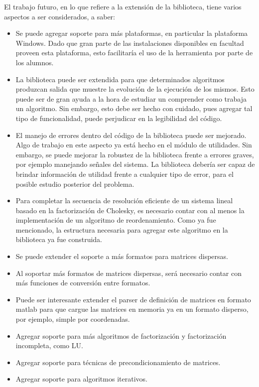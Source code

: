 \documentclass{cacic06}
\begin{document}
El trabajo futuro, en lo que refiere a la extensión de la biblioteca, tiene varios aspectos a ser considerados, a saber:
\begin{itemize}
 \item Se puede agregar soporte para más plataformas, en particular la plataforma Windows. Dado que gran parte de las instalaciones disponibles en facultad proveen esta plataforma, esto facilitaría el uso de la herramienta por parte de los alumnos.
 \item La biblioteca puede ser extendida para que determinados algoritmos produzcan salida que muestre la evolución de la ejecución de los mismos. Esto puede ser de gran ayuda a la hora de estudiar un comprender como trabaja un algoritmo. Sin embargo, esto debe ser hecho con cuidado, pues agregar tal tipo de funcionalidad, puede perjudicar en la legibilidad del código.
\item El manejo de errores dentro del código de la biblioteca puede ser mejorado. Algo de trabajo en este aspecto ya está hecho en el módulo de utilidades. Sin embargo, se puede mejorar la robustez de la biblioteca frente a errores graves, por ejemplo manejando señales del sistema. La biblioteca debería ser capaz de brindar información de utilidad frente a cualquier tipo de error, para el posible estudio posterior del problema.
\item Para completar la secuencia de resolución eficiente de un sistema lineal basado en la factorización de Cholesky, es necesario contar con al menos la implementación de un algoritmo de reordenamiento. Como ya fue mencionado, la estructura necesaria para agregar este algoritmo en la biblioteca ya fue construida.
\item Se puede extender el soporte a más formatos para matrices dispersas.
\item Al soportar más formatos de matrices dispersas, será necesario contar con más funciones de conversión entre formatos.
\item Puede ser interesante extender el parser de definición de matrices en formato matlab para que cargue las matrices en memoria ya en un formato disperso, por ejemplo, simple por coordenadas.
\item Agregar soporte para más algoritmos de factorización y factorización incompleta, como LU.
\item Agregar soporte para técnicas de precondicionamiento de matrices.
\item Agregar soporte para algoritmos iterativos.
\end{itemize}
\end{document}
